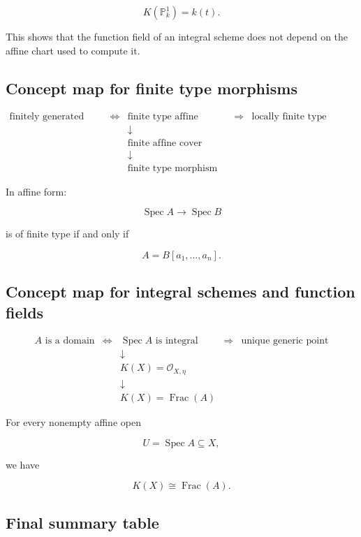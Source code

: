 \documentclass[12pt,a4paper]{article}
\theoremstyle{notespace}
\begin{document}
\[
K(\mathbb P_k^1)=k(t).
\]

This shows that the function field of an integral scheme does not depend on the affine chart used to compute it.

\subsection{Concept map for finite type morphisms}

\[
\begin{array}{ccccccc}
	\text{finitely generated algebra}
	&\Longleftrightarrow&
	\text{finite type affine morphism}
	&\Longrightarrow&
	\text{locally finite type morphism}
	\\[8pt]
	&&
	\downarrow
	&&
	\\[-2pt]
	&&
	\text{finite affine cover}
	&&
	\\[-2pt]
	&&
	\downarrow
	&&
	\\[4pt]
	&&
	\text{finite type morphism}
	&&
\end{array}
\]

In affine form:

\[
\operatorname{Spec}A\to \operatorname{Spec}B
\]

is of finite type if and only if

\[
A=B[a_1,\dots,a_n].
\]

\subsection{Concept map for integral schemes and function fields}

\[
\begin{array}{ccccc}
	A\text{ is a domain}
	&\Longleftrightarrow&
	\operatorname{Spec}A\text{ is integral}
	&\Longrightarrow&
	\text{unique generic point}
	\\[8pt]
	&&
	\downarrow
	&&
	\\[-2pt]
	&&
	K(X)=\mathcal O_{X,\eta}
	&&
	\\[-2pt]
	&&
	\downarrow
	&&
	\\[4pt]
	&&
	K(X)=\operatorname{Frac}(A)
	&&
\end{array}
\]

For every nonempty affine open

\[
U=\operatorname{Spec}A\subseteq X,
\]

we have

\[
K(X)\cong \operatorname{Frac}(A).
\]

\subsection{Final summary table}
\end{document}
